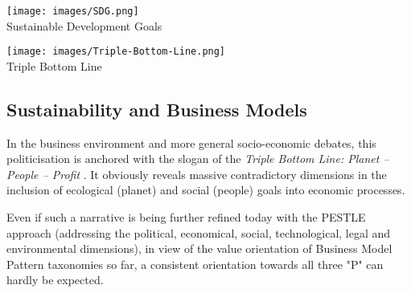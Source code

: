 \documentclass[11pt,a4paper]{article}
\begin{document}
\begin{center}
  \begin{minipage}{.55\textwidth}\centering
    \texttt{[image: images/SDG.png]}\\
    Sustainable Development Goals
  \end{minipage}\hfill
  \begin{minipage}{.4\textwidth}\centering
    \texttt{[image: images/Triple-Bottom-Line.png]}\\[1em]
    Triple Bottom Line
  \end{minipage}
\end{center}

\subsection{Sustainability and Business Models}

In the business environment and more general socio-economic debates, this
politicisation is anchored with the slogan of the \emph{Triple Bottom Line:
  Planet -- People -- Profit} \cite{Elkington1997}. It obviously reveals
massive contradictory dimensions in the inclusion of ecological (planet) and
social (people) goals into economic processes.

Even if such a narrative is being further refined today with the PESTLE
approach (addressing the political, economical, social, technological, legal
and environmental dimensions), in view of the value orientation of Business
Model Pattern taxonomies so far, a consistent orientation towards all three
"P" can hardly be expected.
\end{document}
